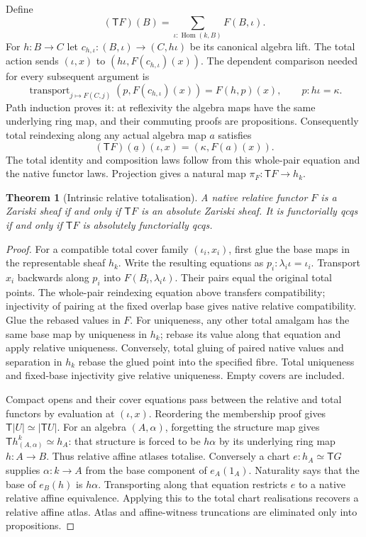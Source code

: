 \documentclass[11pt]{amsart}
\newtheorem{theorem}{Theorem}[section]
\theoremstyle{definition}\newtheorem{definition}[theorem]{Definition}
\theoremstyle{remark}\newtheorem{remark}[theorem]{Remark}
\newcommand{\Hom}{\operatorname{Hom}}
\begin{document}
Define
\[
 (\mathsf T F)(B)=\sum_{\iota:\Hom(k,B)}F(B,\iota).
\]
For $h:B\to C$ let $c_{h,\iota}:(B,\iota)\to(C,h\iota)$ be its
canonical algebra lift. The total action sends $(\iota,x)$ to
$(h\iota,F(c_{h,\iota})(x))$. The dependent comparison needed for every
subsequent argument is
\[
 \operatorname{transport}_{j\mapsto F(C,j)}
       (p,F(c_{h,\iota})(x))=F(h,p)(x),
 \qquad p:h\iota=\kappa.
\]
Path induction proves it: at reflexivity the algebra maps have the same
underlying ring map, and their commuting proofs are propositions.
Consequently total reindexing along any actual algebra map $a$ satisfies
\[
 (\mathsf T F)(\underline a)(\iota,x)=(\kappa,F(a)(x)).
\]
The total identity and composition laws follow from this whole-pair
equation and the native functor laws. Projection gives a natural map
$\pi_F:\mathsf T F\to h_k$.

\begin{theorem}[Intrinsic relative totalisation]
A native relative functor $F$ is a Zariski sheaf if and only if
$\mathsf T F$ is an absolute Zariski sheaf. It is functorially qcqs if
and only if $\mathsf T F$ is absolutely functorially qcqs.
\end{theorem}
\begin{proof}
For a compatible total cover family $(\iota_i,x_i)$, first glue the base
maps in the representable sheaf $h_k$. Write the resulting equations as
$p_i:\lambda_i\iota=\iota_i$. Transport $x_i$ backwards along $p_i$
into $F(B_i,\lambda_i\iota)$. Their pairs equal the original total
points. The whole-pair reindexing equation above transfers compatibility;
injectivity of pairing at the fixed overlap base gives native relative
compatibility. Glue the rebased values in $F$. For uniqueness, any other
total amalgam has the same base map by uniqueness in $h_k$; rebase its
value along that equation and apply relative uniqueness.
Conversely, total gluing of paired native values and separation in $h_k$
rebase the glued point into the specified fibre. Total uniqueness and
fixed-base injectivity give relative uniqueness. Empty covers are included.

Compact opens and their cover equations pass between the relative and
total functors by evaluation at $(\iota,x)$. Reordering the membership
proof gives $\mathsf T|U|\simeq|\mathsf T U|$. For an algebra
$(A,\alpha)$, forgetting the structure map gives
$\mathsf T h^k_{(A,\alpha)}\simeq h_A$: that structure is forced to be
$h\alpha$ by its underlying ring map $h:A\to B$. Thus relative affine
atlases totalise. Conversely a chart $e:h_A\simeq\mathsf T G$ supplies
$\alpha:k\to A$ from the base component of $e_A(1_A)$. Naturality says
that the base of $e_B(h)$ is $h\alpha$. Transporting along that equation
restricts $e$ to a native relative affine equivalence. Applying this to
the total chart realisations recovers a relative affine atlas. Atlas
and affine-witness truncations are eliminated only into propositions.
\end{proof}
\end{document}
